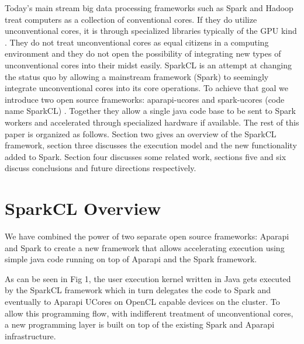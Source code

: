 \documentclass[runningheads,a4paper]{llncs}
\begin{document}
Today’s main stream big data processing frameworks such as Spark \cite{Zaharia:2010} and Hadoop \cite{hadoop:2014} treat computers as a collection of conventional cores. If they do utilize unconventional cores, it is through specialized libraries typically of the GPU kind \cite{John:2014}. They do not treat unconventional cores as equal citizens in a computing environment and they do not open the possibility of integrating new types of unconventional cores into their midst easily.
SparkCL is an attempt at changing the status quo by allowing a mainstream framework (Spark) to seemingly integrate unconventional cores into its core operations. To achieve that goal we introduce two open source frameworks: aparapi-ucores \cite{AparapiUCores:2015} and spark-ucores (code name SparkCL) \cite{SparkCL:2015}. Together they allow a single java code base to be sent to Spark workers and accelerated through specialized hardware if available.
The rest of this paper is organized as follows. Section two gives an overview of the SparkCL framework, section three discusses the execution model and the new functionality added to Spark. Section four discusses some related work, sections five and six discuss conclusions and future directions respectively.

\section{SparkCL Overview}
We have combined the power of two separate open source frameworks: Aparapi and Spark to create a new framework that allows accelerating execution using simple java code running on top of Aparapi and the Spark framework.

As can be seen in Fig 1, the user execution kernel written in Java gets executed by the SparkCL framework which in turn delegates the code to Spark and eventually to Aparapi UCores on OpenCL capable devices on the cluster. To allow this programming flow, with indifferent treatment of unconventional cores, a new programming layer is built on top of the existing Spark and Aparapi infrastructure.
\end{document}

